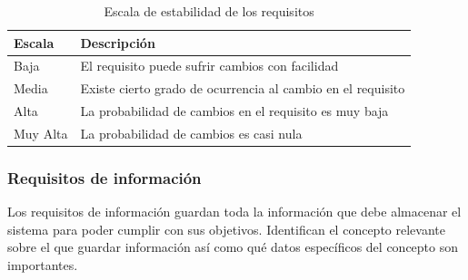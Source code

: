 \begin{table}[htpb]
\centering
\begin{tabularx}{\textwidth}{|l|X|}
\hline
\rowcolor[gray]{0.9}\textbf{Escala}   & \textbf{Descripción}                                                 \\ \hline
Baja     & El requisito puede sufrir cambios con facilidad             \\ \hline
Media    & Existe cierto grado de ocurrencia al cambio en el requisito \\ \hline
Alta     & La probabilidad de cambios en el requisito es muy baja      \\ \hline
Muy Alta & La probabilidad de cambios es casi nula                     \\ \hline
\end{tabularx}
\caption{Escala de estabilidad de los requisitos}
\label{esc_estab}
\end{table}


\subsubsection{Requisitos de información}


Los requisitos de información guardan toda la información que debe almacenar el sistema para poder cumplir con sus objetivos. Identifican el concepto relevante sobre el que guardar información así como qué datos específicos del concepto son importantes.


